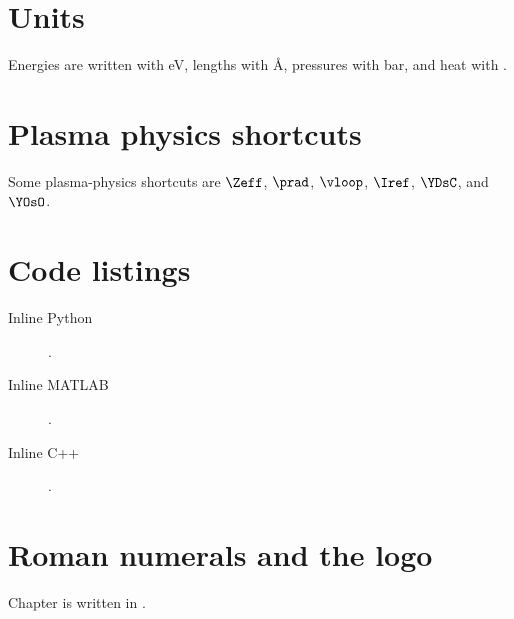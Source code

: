 \documentclass[11pt,a4paper]{article}
\begin{document}
\section{Units}

Energies are written with \si{\eV}, lengths with \si{\angstrom}, pressures with
\si{\bar}, and heat with \si{\calorie}.

\section{Plasma physics shortcuts}

Some plasma-physics shortcuts are
\(\Zeff \), \(\prad \), \(\vloop \), \(\Iref \), \(\YDsC \), and \(\YOsO \).

\section{Code listings}

\begin{description}
    \item[Inline Python] .
    \item[Inline MATLAB] . %
    \item[Inline C++] .
\end{description}

\section{Roman numerals and the \texorpdfstring{\CC{}}{C++} logo}

Chapter  is written in \CC{}.
\end{document}
